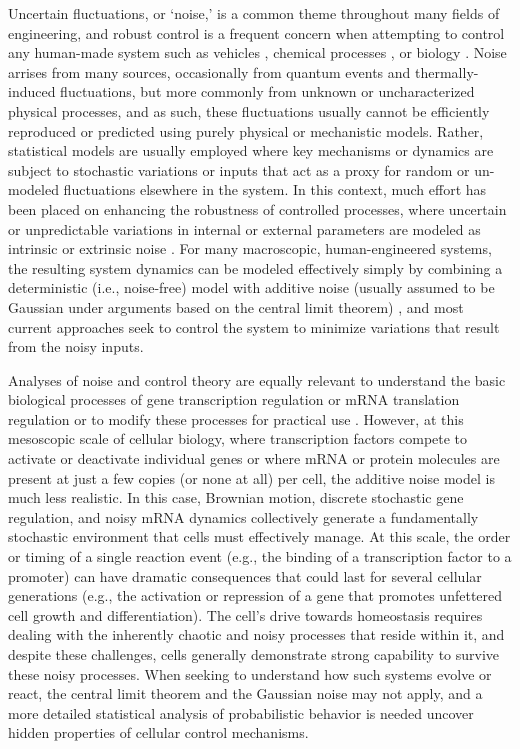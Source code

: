 \documentclass[12pt]{iopart}
\begin{document}
Uncertain fluctuations, or `noise,' is a common theme throughout many fields of engineering, and robust control is a frequent concern when attempting to control any human-made system such as vehicles , chemical processes , or biology .
Noise arrises from many sources, occasionally from quantum events and thermally-induced fluctuations, but more commonly from unknown or uncharacterized physical processes, and as such, these fluctuations usually cannot be efficiently reproduced or predicted using purely physical or mechanistic models.
Rather, statistical models are usually employed where key mechanisms or dynamics are subject to stochastic variations or inputs that act as a proxy for random or un-modeled fluctuations elsewhere in the system.
In this context, much effort has been placed on enhancing the robustness of controlled processes, where uncertain or unpredictable variations in internal or external parameters are modeled as intrinsic or extrinsic noise .
For many macroscopic, human-engineered systems, the resulting system dynamics can be modeled effectively simply by combining a deterministic (i.e., noise-free) model with additive noise (usually assumed to be Gaussian under arguments based on the central limit theorem) , and most current approaches seek to control the system to minimize variations that result from the noisy inputs. 

Analyses of noise and control theory are equally relevant to understand the basic biological processes of gene transcription regulation  or mRNA translation regulation or to modify these processes for practical use .
However, at this mesoscopic scale of cellular biology, where transcription factors compete to activate or deactivate individual genes or where mRNA or protein molecules are present at just a few copies (or none at all) per cell, the additive noise model is much less realistic.
In this case, Brownian motion, discrete stochastic gene regulation, and noisy mRNA dynamics collectively generate a fundamentally stochastic environment that cells must effectively manage. 
At this scale, the order or timing of a single reaction event (e.g., the binding of a transcription factor to a promoter) can have dramatic consequences that could last for several cellular generations (e.g., the activation or repression of a gene that promotes unfettered cell growth and differentiation). 
The cell's drive towards homeostasis requires dealing with the inherently chaotic and noisy processes that reside within it, and despite these challenges, cells generally demonstrate strong capability to survive these noisy processes. 
When seeking to understand how such systems evolve or react, the central limit theorem and the Gaussian noise may not apply, and a more detailed statistical analysis of probabilistic behavior is needed uncover hidden properties of cellular control mechanisms.
\end{document}
